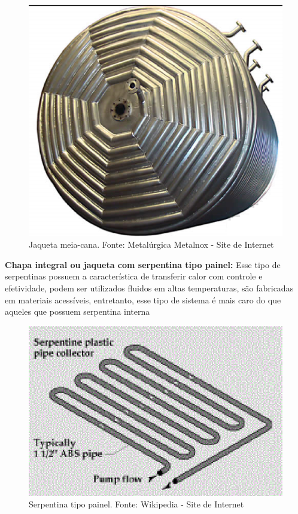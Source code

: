 \begin{figure}[h]
	\centering
	\includegraphics[keepaspectratio=true,scale=0.2]{figuras/jaqueta4.eps}
	\caption{Jaqueta meia-cana. Fonte: Metalúrgica Metalnox - Site de Internet}
	\label{jaqueta4}
\end{figure}

\textbf{Chapa integral ou jaqueta com serpentina tipo painel:} Esse tipo de serpentinas possuem a característica de transferir calor com controle e efetividade, podem ser utilizados fluidos em altas temperaturas, são fabricadas em materiais acessíveis, entretanto, esse tipo de sistema é mais caro do que aqueles que possuem serpentina interna \cite{mcketta1991heat}

\begin{figure}[h]
	\centering
	\includegraphics[keepaspectratio=true,scale=0.8]{figuras/serpentina.eps}
	\caption{Serpentina tipo painel. Fonte: Wikipedia - Site de Internet}
	\label{serpentina}
\end{figure}


